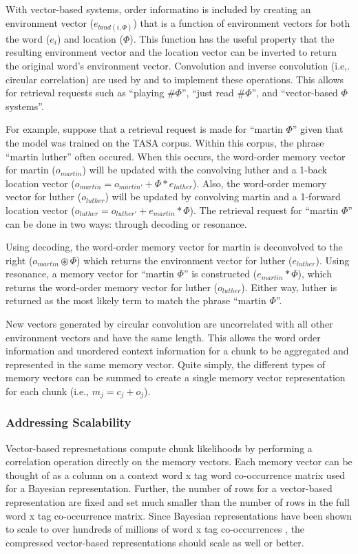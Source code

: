 \documentclass[man,floatsintext]{apa6}
\begin{document}
With vector-based systems, order informatino is included by creating an environment vector ($e_{bind(i,\Phi)}$) that is a function of environment vectors for both the word ($e_{i}$) and location ($\Phi$).
This function has the useful property that the resulting environment vector and the location vector can be inverted to return the original word's environment vector.
Convolution and inverse convolution (i.e,. circular correlation) are used by \textcite{Plate1995} and \textcite{Jones2007} to implement these operations.
This allows for retrieval requests such as ``playing \#$\Phi$'', ``just read \#$\Phi$'', and ``vector-based $\Phi$ systems''.

For example, suppose that a retrieval request is made for ``martin $\Phi$'' given that the model was trained on the TASA corpus.
Within this corpus, the phrase ``martin luther'' often occured.
When this occurs, the word-order memory vector for martin ($o_{martin}$) will be updated with the convolving luther and a 1-back location vector ($o_{martin} = o_{martin'} + \Phi * e_{luther}$).
Also, the word-order memory vector for luther ($o_{luther}$) will be updated by convolving martin and a 1-forward location vector ($o_{luther} = o_{luther'} + e_{martin} * \Phi$).
The retrieval request for ``martin $\Phi$'' can be done in two ways: through decoding or resonance.

Using decoding, the word-order memory vector for martin is deconvolved to the right ($o_{martin} \circledast \Phi$) which returns the environment vector for luther ($e_{luther}$).
Using resonance, a memory vector for ``martin $\Phi$'' is constructed ($e_{martin} * \Phi$), which returns the word-order memory vector for luther ($o_{luther}$).
Either way, luther is returned as the most likely term to match the phrase ``martin $\Phi$''.

New vectors generated by circular convolution are uncorrelated with all other environment vectors and have the same length.
This allows the word order information and unordered context information for a chunk to be aggregated and represented in the same memory vector.
Quite simply, the different types of memory vectors can be summed to create a single memory vector representation for each chunk (i.e., $m_{j} = c_{j} + o_{j}$).

\subsubsection{Addressing Scalability}

Vector-based represnetations compute chunk likelihoods by performing a correlation operation directly on the memory vectors.
Each memory vector can be thought of as a column on a context word x tag word co-occurrence matrix used for a Bayesian representation.
Further, the number of rows for a vector-based representation are fixed and set much smaller than the number of rows in the full word x tag co-occurrence matrix.
Since Bayesian representations have been shown to scale to over hundreds of millions of word x tag co-occurrences \parencite{Stanley2013}, the compressed vector-based representations should scale as well or better.
\end{document}

